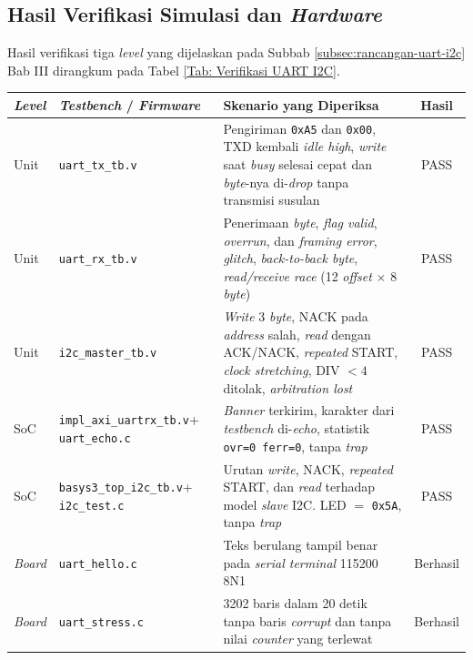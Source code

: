 \subsection{Hasil Verifikasi Simulasi dan \textit{Hardware}}
\label{subsec:uji-uart-i2c}

Hasil verifikasi tiga \textit{level} yang dijelaskan pada Subbab \ref{subsec:rancangan-uart-i2c} Bab III dirangkum pada Tabel \ref{Tab: Verifikasi UART I2C}.

\begin{table}[H]
	\centering
	\small
	\begin{tabular}{|p{1.4cm}|p{4.2cm}|p{6.0cm}|c|}
		\hline
		\textbf{\textit{Level}} & \textbf{\textit{Testbench} / \textit{Firmware}} & \textbf{Skenario yang Diperiksa} & \textbf{Hasil} \\
		\hline
		Unit & \texttt{uart\_tx\_tb.v} & Pengiriman \texttt{0xA5} dan \texttt{0x00}, TXD kembali \textit{idle high}, \textit{write} saat \textit{busy} selesai cepat dan \textit{byte}-nya di-\textit{drop} tanpa transmisi susulan & PASS \\ \hline
		Unit & \texttt{uart\_rx\_tb.v} & Penerimaan \textit{byte}, \textit{flag valid}, \textit{overrun}, dan \textit{framing error}, \textit{glitch}, \textit{back-to-back byte}, \textit{read/receive race} (12 \textit{offset} $\times$ 8 \textit{byte}) & PASS \\ \hline
		Unit & \texttt{i2c\_master\_tb.v} & \textit{Write} 3 \textit{byte}, NACK pada \textit{address} salah, \textit{read} dengan ACK/NACK, \textit{repeated} START, \textit{clock stretching}, DIV $<4$ ditolak, \textit{arbitration lost} & PASS \\ \hline
		SoC & \texttt{impl\_axi\_}\allowbreak\texttt{uartrx\_tb.v}\newline + \texttt{uart\_echo.c} & \textit{Banner} terkirim, karakter dari \textit{testbench} di-\textit{echo}, statistik \texttt{ovr=0 ferr=0}, tanpa \textit{trap} & PASS \\ \hline
		SoC & \texttt{basys3\_top\_}\allowbreak\texttt{i2c\_tb.v}\newline + \texttt{i2c\_test.c} & Urutan \textit{write}, NACK, \textit{repeated} START, dan \textit{read} terhadap model \textit{slave} I2C. LED $=$ \texttt{0x5A}, tanpa \textit{trap} & PASS \\ \hline
		\textit{Board} & \texttt{uart\_hello.c} & Teks berulang tampil benar pada \textit{serial terminal} 115200 8N1 & Berhasil \\ \hline
		\textit{Board} & \texttt{uart\_stress.c} & 3202 baris dalam 20 detik tanpa baris \textit{corrupt} dan tanpa nilai \textit{counter} yang terlewat & Berhasil \\ \hline

\end{tabular}
\end{table}
